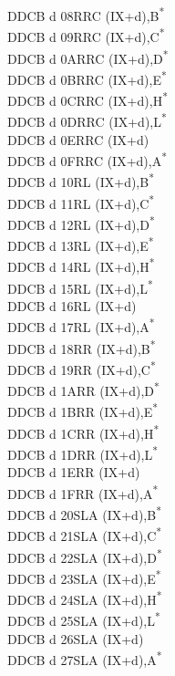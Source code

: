 \documentclass[twoside,openright,a4paper]{book}
\begin{document}
\begin{multicols}{3}
{\begin{tabbing}
	DDCB d 08\>RRC (IX+d),B\textsuperscript{*}\\
	DDCB d 09\>RRC (IX+d),C\textsuperscript{*}\\
	DDCB d 0A\>RRC (IX+d),D\textsuperscript{*}\\
	DDCB d 0B\>RRC (IX+d),E\textsuperscript{*}\\
	DDCB d 0C\>RRC (IX+d),H\textsuperscript{*}\\
	DDCB d 0D\>RRC (IX+d),L\textsuperscript{*}\\
	DDCB d 0E\>RRC (IX+d)\\
	DDCB d 0F\>RRC (IX+d),A\textsuperscript{*}\\
	DDCB d 10\>RL (IX+d),B\textsuperscript{*}\\
	DDCB d 11\>RL (IX+d),C\textsuperscript{*}\\
	DDCB d 12\>RL (IX+d),D\textsuperscript{*}\\
	DDCB d 13\>RL (IX+d),E\textsuperscript{*}\\
	DDCB d 14\>RL (IX+d),H\textsuperscript{*}\\
	DDCB d 15\>RL (IX+d),L\textsuperscript{*}\\
	DDCB d 16\>RL (IX+d)\\
	DDCB d 17\>RL (IX+d),A\textsuperscript{*}\\
	DDCB d 18\>RR (IX+d),B\textsuperscript{*}\\
	DDCB d 19\>RR (IX+d),C\textsuperscript{*}\\
	DDCB d 1A\>RR (IX+d),D\textsuperscript{*}\\
	DDCB d 1B\>RR (IX+d),E\textsuperscript{*}\\
	DDCB d 1C\>RR (IX+d),H\textsuperscript{*}\\
	DDCB d 1D\>RR (IX+d),L\textsuperscript{*}\\
	DDCB d 1E\>RR (IX+d)\\
	DDCB d 1F\>RR (IX+d),A\textsuperscript{*}\\
	DDCB d 20\>SLA (IX+d),B\textsuperscript{*}\\
	DDCB d 21\>SLA (IX+d),C\textsuperscript{*}\\
	DDCB d 22\>SLA (IX+d),D\textsuperscript{*}\\
	DDCB d 23\>SLA (IX+d),E\textsuperscript{*}\\
	DDCB d 24\>SLA (IX+d),H\textsuperscript{*}\\
	DDCB d 25\>SLA (IX+d),L\textsuperscript{*}\\
	DDCB d 26\>SLA (IX+d)\\
	DDCB d 27\>SLA (IX+d),A\textsuperscript{*}\\

\end{tabbing}}
\end{multicols}
\end{document}
